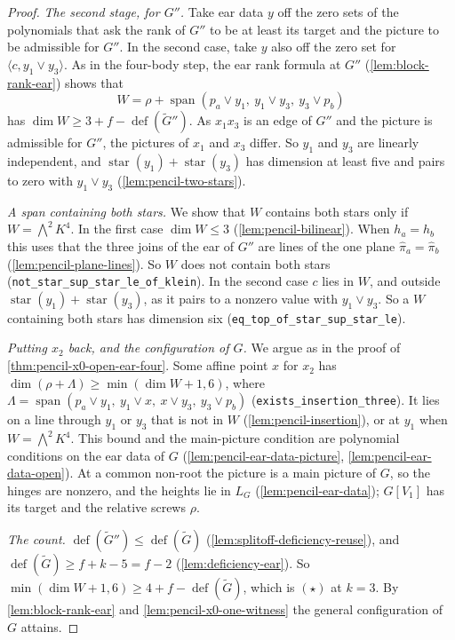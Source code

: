 \begin{proof}
  \emph{The second stage, for $G''$.} Take ear data $y$ off the zero sets
  of the polynomials that ask the rank of $G''$ to be at least its target
  and the picture to be admissible for $G''$. In the second case, take
  $y$ also off the zero set for $\langle c, y_1 \vee y_3 \rangle$. As in
  the four-body step, the ear rank formula at $G''$
  (\cref{lem:block-rank-ear}) shows that
  \[
    W = \rho + \operatorname{span}(p_a \vee y_1,\ y_1 \vee y_3,\
    y_3 \vee p_b)
  \]
  has $\dim W \ge 3 + f - \operatorname{def}(\tilde G'')$. As $x_1 x_3$ is
  an edge of $G''$ and the picture is admissible for $G''$, the pictures
  of $x_1$ and $x_3$ differ. So $y_1$ and $y_3$ are linearly independent,
  and $\operatorname{star}(y_1) + \operatorname{star}(y_3)$ has dimension
  at least five and pairs to zero with $y_1 \vee y_3$
  (\cref{lem:pencil-two-stars}).

  \emph{A span containing both stars.} We show that $W$ contains both
  stars only if $W = \bigwedge^2 K^4$. In the first case
  $\dim W \le 3$ (\cref{lem:pencil-bilinear}). When $h_a = h_b$ this uses
  that the three joins of the ear of $G''$ are lines of the one plane
  $\hat\pi_a = \hat\pi_b$ (\cref{lem:pencil-plane-lines}). So $W$ does not
  contain both stars (\texttt{not\_star\_sup\_star\_le\_of\_klein}). In
  the second case $c$ lies in $W$, and outside $\operatorname{star}(y_1) +
  \operatorname{star}(y_3)$, as it pairs to a nonzero value with $y_1
  \vee y_3$. So a $W$ containing both stars has dimension six
  (\texttt{eq\_top\_of\_star\_sup\_star\_le}).

  \emph{Putting $x_2$ back, and the configuration of $G$.} We argue as
  in the proof of \cref{thm:pencil-x0-open-ear-four}. Some affine point
  $x$ for $x_2$ has $\dim(\rho + \Lambda) \ge \min(\dim W + 1, 6)$, where
  $\Lambda = \operatorname{span}(p_a \vee y_1,\ y_1 \vee x,\
  x \vee y_3,\ y_3 \vee p_b)$ (\texttt{exists\_insertion\_three}). It
  lies on a line through $y_1$ or $y_3$ that is not in $W$
  (\cref{lem:pencil-insertion}), or at $y_1$ when $W = \bigwedge^2 K^4$.
  This bound and the main-picture condition are polynomial conditions on
  the ear data of $G$ (\cref{lem:pencil-ear-data-picture},
  \cref{lem:pencil-ear-data-open}). At a common non-root the picture is a
  main picture of $G$, so the hinges are nonzero, and the heights lie in
  $L_G$ (\cref{lem:pencil-ear-data}); $G[V_1]$ has its target and the
  relative screws $\rho$.

  \emph{The count.} $\operatorname{def}(\tilde G'') \le
  \operatorname{def}(\tilde G)$ (\cref{lem:splitoff-deficiency-reuse}),
  and $\operatorname{def}(\tilde G) \ge f + k - 5 = f - 2$
  (\cref{lem:deficiency-ear}). So
  $\min(\dim W + 1, 6) \ge 4 + f - \operatorname{def}(\tilde G)$, which
  is $(\star)$ at $k = 3$. By \cref{lem:block-rank-ear} and
  \cref{lem:pencil-x0-one-witness} the general configuration of $G$
  attains.
\end{proof}

